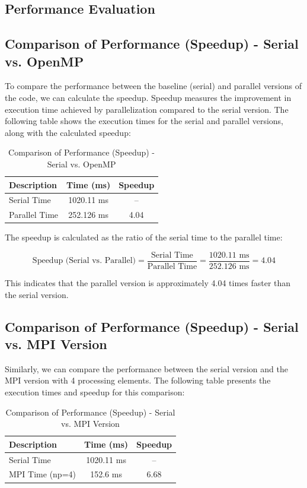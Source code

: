 \subsection{Performance Evaluation}

\subsection*{Comparison of Performance (Speedup) - Serial vs. OpenMP}

To compare the performance between the baseline (serial) and parallel versions of the code, we can calculate the speedup. Speedup measures the improvement in execution time achieved by parallelization compared to the serial version. The following table shows the execution times for the serial and parallel versions, along with the calculated speedup:

\begin{table}[htbp]
  \caption{Comparison of Performance (Speedup) - Serial vs. OpenMP}
  \centering
  \begin{tabular}{lcc}
    \toprule
    \textbf{Description} & \textbf{Time (ms)} & \textbf{Speedup} \\
    \midrule
    Serial Time & 1020.11 ms & -- \\
    Parallel Time & 252.126 ms & 4.04 \\
    \bottomrule
  \end{tabular}
\end{table}

The speedup is calculated as the ratio of the serial time to the parallel time:

\[
\text{Speedup (Serial vs. Parallel)} = \frac{\text{Serial Time}}{\text{Parallel Time}} = \frac{1020.11 \text{ ms}}{252.126 \text{ ms}} = 4.04
\]

This indicates that the parallel version is approximately 4.04 times faster than the serial version.

\subsection*{Comparison of Performance (Speedup) - Serial vs. MPI Version}

Similarly, we can compare the performance between the serial version and the MPI version with 4 processing elements. The following table presents the execution times and speedup for this comparison:

\begin{table}[htbp]
  \caption{Comparison of Performance (Speedup) - Serial vs. MPI Version}
  \centering
  \begin{tabular}{lcc}
    \toprule
    \textbf{Description} & \textbf{Time (ms)} & \textbf{Speedup} \\
    \midrule
    Serial Time & 1020.11 ms & -- \\
    MPI Time (np=4) & 152.6 ms & 6.68 \\
    \bottomrule
  \end{tabular}
\end{table}

